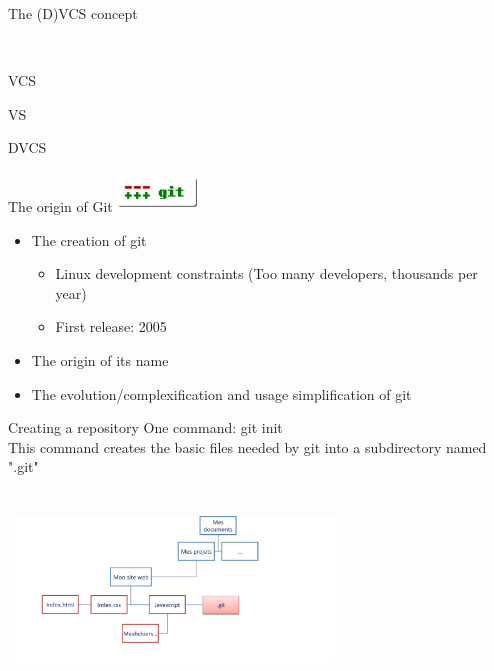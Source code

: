 \documentclass{beamer}
\begin{document}
\begin{frame}{The (D)VCS concept}
\begin{minipage}{0.4\textwidth}
\begin{flushright}
    \end{flushright}
    \end{minipage}\\[0.2cm]
    \begin{minipage}{0.2\textwidth}
    \begin{flushright}
    VCS
    \end{flushright}
    \end{minipage}\hfill
    \begin{minipage}{0.5\textwidth}
    \begin{center}
    VS
    \end{center}
    \end{minipage}\hfill 
    \begin{minipage}{0.2\textwidth}
    \begin{flushleft}
    DVCS
    \end{flushleft}
    \end{minipage}
\end{frame}

\begin{frame}{The origin of Git}
    \includegraphics[width=60pt,height=30pt]{git-scm-logo.png}
    \begin{itemize}
        \item The creation of git
        \begin{itemize}
            \item Linux development constraints (Too many developers, thousands per year)
            \item First release: 2005
        \end{itemize}
        \pause
        \item The origin of its name
        \pause
        \item The evolution/complexification and usage simplification of git
    \end{itemize}
\end{frame}

\begin{frame}{Creating a repository}
    One command: git init\\
    This command creates the basic files needed by git into a subdirectory named ".git" \\
    \ \\
    \ \\
    \includegraphics[width=250pt,height=110pt]{fileinit.png}
\end{frame}
\end{document}
